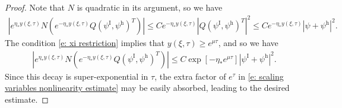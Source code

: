 \documentclass[11pt]{article}
\numberwithin{equation}{section}
\numberwithin{prop}{section}
\newcommand{\psih}{\psi^\mathrm{h}}
\newcommand{\psiI}{\psi^\mathrm{I}}
\begin{document}
\begin{proof}
	Note that $N$ is quadratic in its argument, so we have 
	\begin{align*}
	| e^{\eta_* y(\xi, \tau)} N (e^{-\eta_* y(\xi, \tau)} Q(\psiI,\psih)^T) | \leq C e^{-\eta_* y(\xi, \tau)} |Q (\psiI, \psih)^T|^2 \leq C e^{- \eta_* y (\xi, \tau)} |\psi+ \psih|^2. 
	\end{align*}
	The condition \eqref{e: xi restriction} implies that $y(\xi, \tau) \geq e^{\mu \tau}$, and so we have 
	\begin{align*}
	| e^{\eta_* y(\xi, \tau)} N (e^{-\eta_* y(\xi, \tau)} Q(\psiI,\psih)^T) | \leq C \exp \left[ - \eta_* e^{\mu \tau} \right] |\psiI + \psih|^2. 
	\end{align*} 
	Since this decay is super-exponential in $\tau$, the extra factor of $e^\tau$ in \eqref{e: scaling variables nonlinearity estimate} may be easily absorbed, leading to the desired estimate. 
\end{proof}
\end{document}

